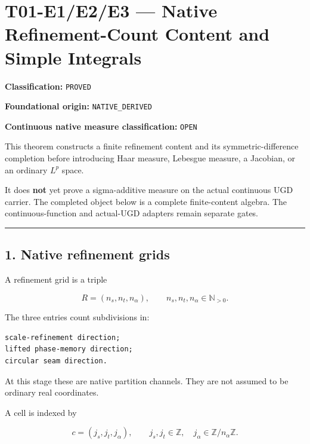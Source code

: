 \hypertarget{t01-e1e2e3-native-refinement-count-content-and-simple-integrals}{%
\chapter{T01-E1/E2/E3 --- Native Refinement-Count Content and Simple Integrals}\label{t01-e1e2e3-native-refinement-count-content-and-simple-integrals}}

\textbf{Classification:} \texttt{PROVED}

\textbf{Foundational origin:} \texttt{NATIVE\_DERIVED}

\textbf{Continuous native measure classification:} \texttt{OPEN}

This theorem constructs a finite refinement content and its symmetric-difference
completion before introducing Haar measure, Lebesgue measure, a Jacobian, or an
ordinary \(L^p\) space.

It does \textbf{not} yet prove a sigma-additive measure on the actual continuous UGD
carrier. The completed object below is a complete finite-content algebra. The
continuous-function and actual-UGD adapters remain separate gates.

\begin{center}\rule{0.5\linewidth}{0.5pt}\end{center}

\hypertarget{native-refinement-grids}{%
\section{1. Native refinement grids}\label{native-refinement-grids}}

A refinement grid is a triple

\[
R=(n_s,n_t,n_\alpha),
\qquad
n_s,n_t,n_\alpha\in\mathbb N_{>0}.
\tag{1.1}
\]

The three entries count subdivisions in:

\begin{verbatim}
scale-refinement direction;
lifted phase-memory direction;
circular seam direction.
\end{verbatim}

At this stage these are native partition channels. They are not assumed to be
ordinary real coordinates.

A cell is indexed by

\[
c=(j_s,j_t,j_\alpha),
\qquad
j_s,j_t\in\mathbb Z,
\quad
j_\alpha\in\mathbb Z/n_\alpha\mathbb Z.
\tag{1.2}
\]

